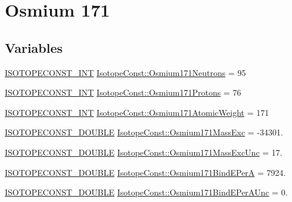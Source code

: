 \hypertarget{group___isotope_const-_osmium-_os171}{}\section{Osmium 171}
\label{group___isotope_const-_osmium-_os171}
\subsection*{Variables}
\begin{DoxyCompactItemize}
\item 
\mbox{\hyperlink{group___isotope_const-_macros_ga5f18360b3e99483a35c32d789e62621c}{I\+S\+O\+T\+O\+P\+E\+C\+O\+N\+S\+T\+\_\+\+I\+NT}} \mbox{\hyperlink{group___isotope_const-_osmium-_os171_ga5e57bdf36849d54139a8ba37d47f9fb8}{Isotope\+Const\+::\+Osmium171\+Neutrons}} = 95
\item 
\mbox{\hyperlink{group___isotope_const-_macros_ga5f18360b3e99483a35c32d789e62621c}{I\+S\+O\+T\+O\+P\+E\+C\+O\+N\+S\+T\+\_\+\+I\+NT}} \mbox{\hyperlink{group___isotope_const-_osmium-_os171_gab33a423418a684f0a87ff03e793a64ce}{Isotope\+Const\+::\+Osmium171\+Protons}} = 76
\item 
\mbox{\hyperlink{group___isotope_const-_macros_ga5f18360b3e99483a35c32d789e62621c}{I\+S\+O\+T\+O\+P\+E\+C\+O\+N\+S\+T\+\_\+\+I\+NT}} \mbox{\hyperlink{group___isotope_const-_osmium-_os171_ga976551a16541a2b59e90f403b3db2a86}{Isotope\+Const\+::\+Osmium171\+Atomic\+Weight}} = 171
\item 
\mbox{\hyperlink{group___isotope_const-_macros_ga8f45a7272ce02c0b4c65c44636ed719a}{I\+S\+O\+T\+O\+P\+E\+C\+O\+N\+S\+T\+\_\+\+D\+O\+U\+B\+LE}} \mbox{\hyperlink{group___isotope_const-_osmium-_os171_gaf9de4f50012fefd77a2df6d858b928e0}{Isotope\+Const\+::\+Osmium171\+Mass\+Exc}} = -\/34301.
\item 
\mbox{\hyperlink{group___isotope_const-_macros_ga8f45a7272ce02c0b4c65c44636ed719a}{I\+S\+O\+T\+O\+P\+E\+C\+O\+N\+S\+T\+\_\+\+D\+O\+U\+B\+LE}} \mbox{\hyperlink{group___isotope_const-_osmium-_os171_ga5696b6b3fc5e05181dcc842f64578ce4}{Isotope\+Const\+::\+Osmium171\+Mass\+Exc\+Unc}} = 17.
\item 
\mbox{\hyperlink{group___isotope_const-_macros_ga8f45a7272ce02c0b4c65c44636ed719a}{I\+S\+O\+T\+O\+P\+E\+C\+O\+N\+S\+T\+\_\+\+D\+O\+U\+B\+LE}} \mbox{\hyperlink{group___isotope_const-_osmium-_os171_ga5014e6cf40bbff678337452b56cfa29a}{Isotope\+Const\+::\+Osmium171\+Bind\+E\+PerA}} = 7924.
\item 
\mbox{\hyperlink{group___isotope_const-_macros_ga8f45a7272ce02c0b4c65c44636ed719a}{I\+S\+O\+T\+O\+P\+E\+C\+O\+N\+S\+T\+\_\+\+D\+O\+U\+B\+LE}} \mbox{\hyperlink{group___isotope_const-_osmium-_os171_ga0b380da57ed854b79a49a9b14434ad7d}{Isotope\+Const\+::\+Osmium171\+Bind\+E\+Per\+A\+Unc}} = 0.

\end{DoxyCompactItemize}
